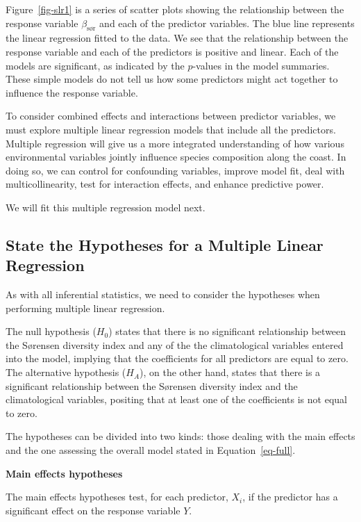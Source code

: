 \documentclass[
  letterpaper,
]{book}
\begin{document}
Figure~\ref{fig-slr1} is a series of scatter plots showing the
relationship between the response variable \(\beta_\text{sør}\) and each
of the predictor variables. The blue line represents the linear
regression fitted to the data. We see that the relationship between the
response variable and each of the predictors is positive and linear.
Each of the models are significant, as indicated by the \(p\)-values in
the model summaries. These simple models do not tell us how some
predictors might act together to influence the response variable.

To consider combined effects and interactions between predictor
variables, we must explore multiple linear regression models that
include all the predictors. Multiple regression will give us a more
integrated understanding of how various environmental variables jointly
influence species composition along the coast. In doing so, we can
control for confounding variables, improve model fit, deal with
multicollinearity, test for interaction effects, and enhance predictive
power.

We will fit this multiple regression model next.

\subsection{State the Hypotheses for a Multiple Linear
Regression}\label{state-the-hypotheses-for-a-multiple-linear-regression}

As with all inferential statistics, we need to consider the hypotheses
when performing multiple linear regression.

The null hypothesis (\(H_0\)) states that there is no significant
relationship between the Sørensen diversity index and any of the the
climatological variables entered into the model, implying that the
coefficients for all predictors are equal to zero. The alternative
hypothesis (\(H_A\)), on the other hand, states that there is a
significant relationship between the Sørensen diversity index and the
climatological variables, positing that at least one of the coefficients
is not equal to zero.

The hypotheses can be divided into two kinds: those dealing with the
main effects and the one assessing the overall model stated in
Equation~\ref{eq-full}.

\textbf{Main effects hypotheses}

The main effects hypotheses test, for each predictor, \(X_i\), if the
predictor has a significant effect on the response variable \(Y\).
\end{document}
